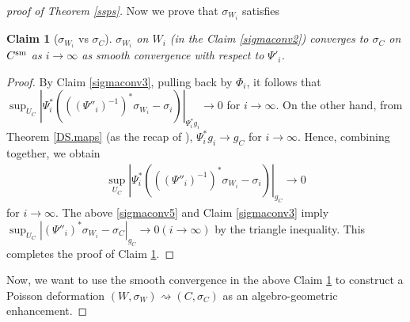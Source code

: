 \documentclass[12pt,a4paper]{amsart}
\newtheorem{Claim}[Thm]{Claim}
\theoremstyle{remark}
\theoremstyle{definition}
\begin{document}
\begin{proof}[proof of Theorem \ref{ssps}]
Now we prove that $\sigma_{W_i}$ satisfies 
\begin{Claim}[$\sigma_{W_i}$ vs $\sigma_C$]\label{sigmaconv4}
$\sigma_{W_i}$ on $W_i$ (in the Claim \ref{sigmaconv2}) 
converges to $\sigma_C$ 
on $C^{\rm sm}$ as $i\to \infty$ as smooth convergence 
with respect to $\Psi'_i$. 
\end{Claim}

\begin{proof}
By Claim \ref{sigmaconv3}, pulling back by $\Phi_i$, 
it follows that 
$\sup_{U_C}|\Psi_i^*(((\Psi''_i)^{-1})^*\sigma_{W_i}-
\sigma_{i})|_{\Psi_i^* g_i}\to 0$ for $i\to \infty$. 
On the other hand, 
from Theorem \ref{DS.maps} (as the recap of \cite{DSII}), 
$\Psi_i^* g_i\to g_C$ for $i\to \infty$. 
Hence, combining together, we obtain 
\begin{align}\label{sigmaconv5}
\sup_{U_C}|\Psi_i^*(((\Psi''_i)^{-1})^*\sigma_{W_i}-
\sigma_{i})|_{g_C}\to 0
\end{align}
for $i\to \infty$. The above \eqref{sigmaconv5} and 
Claim \ref{sigmaconv3} imply 
$\sup_{U_C}|(\Psi''_i)^* \sigma_{W_i}-\sigma_C|_{g_C}\to 0 (i\to \infty)$ 
by the triangle inequality. This completes the proof of Claim 
\ref{sigmaconv4}. 
\end{proof}

Now, we want to use the smooth convergence 
in the above 
Claim \ref{sigmaconv4} to construct a Poisson 
deformation 
$(W,\sigma_W)\rightsquigarrow (C,\sigma_C)$ 
as an algebro-geometric enhancement. 


\end{proof}
\end{document}
